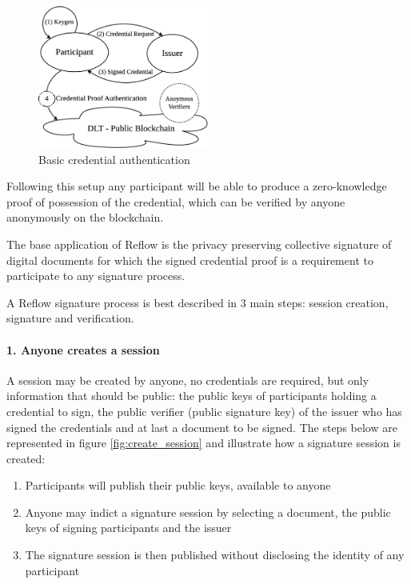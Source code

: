 \documentclass[twocolumn]{article}
\begin{document}
\begin{figure}
  \caption{Basic credential authentication }
  \label{fig:credential_diagram}
  \centering
  \includegraphics[width=0.5\textwidth]{credential_diagram.eps}
\end{figure}


Following this setup any participant will be able to produce a
zero-knowledge proof of possession of the credential, which can be
verified by anyone anonymously on the blockchain.

The base application of Reflow is the privacy preserving collective
signature of digital documents for which the signed credential proof is a
requirement to participate to any signature process.

A Reflow signature process is best described in 3 main steps:
session creation, signature and verification.

\paragraph*{1. Anyone creates a session}

A session may be created by anyone, no credentials are required, but only information that should be public: the public keys of participants holding a credential to sign, the public verifier (public signature key) of the issuer who has signed the credentials and at last a document to be signed. The steps below are represented in figure \ref{fig:create_session} and illustrate how a signature session is created: 

\begin{enumerate}
  \item Participants will publish their public keys, available to anyone 
  \item Anyone may indict a signature session by selecting a document, the public keys of signing participants and the issuer
  \item The signature session is then published without disclosing the identity of any participant
\end{enumerate}
\end{document}
